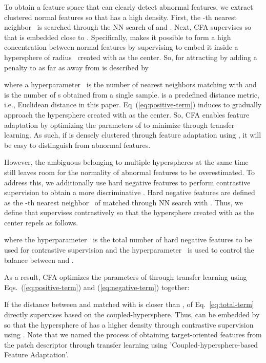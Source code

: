 \documentclass[10pt,twocolumn,letterpaper]{article}
\begin{document}
        To obtain a feature space that can clearly detect abnormal features, we extract clustered normal features so that  has a high density. First, the -th nearest neighbor~ is searched through the NN search of  and . Next, CFA supervises  so that  is embedded close to .
        Specifically,  makes it possible to form a high concentration between normal features by supervising  to embed it inside a hypersphere of radius~ created with  as the center. So,  for attracting by adding a penalty to  as far as  away from  is described by
        
        where a hyperparameter~ is the number of nearest neighbors matching with  and  is the number of s obtained from a single sample.  is a predefined distance metric, i.e., Euclidean distance in this paper. Eq~(\ref{eq:positive-term}) induces  to gradually approach the hypersphere created with  as the center. So, CFA enables feature adaptation by optimizing the parameters of  to minimize  through transfer learning. As such, if  is densely clustered through feature adaptation using , it will be easy to distinguish from abnormal features.
        
        However, the ambiguous  belonging to multiple hyperspheres at the same time still leaves room for the normality of abnormal features to be overestimated. To address this, we additionally use hard negative features to perform contrastive supervision to obtain a more discriminative . Hard negative features are defined as the -th nearest neighbor~ of  matched through NN search with . Thus, we define  that supervises  contrastively so that the hypersphere created with  as the center repels  as follows.
        
        where the hyperparameter~ is the total number of hard negative features to be used for contrastive supervision and the hyperparameter~ is used to control the balance between  and .

        As a result, CFA optimizes the parameters of  through transfer learning using Eqs.~(\ref{eq:positive-term}) and (\ref{eq:negative-term}) together:
        
        If the distance between  and  matched with  is closer than ,  of Eq.~{\ref{eq:total-term}} directly supervises  based on the coupled-hypersphere. Thus,  can be embedded by  so that the hypersphere of  has a higher density through contrastive supervision using . Note that we named the process of obtaining target-oriented features from the patch descriptor through transfer learning using  'Coupled-hypersphere-based Feature Adaptation'.
        
\end{document}

